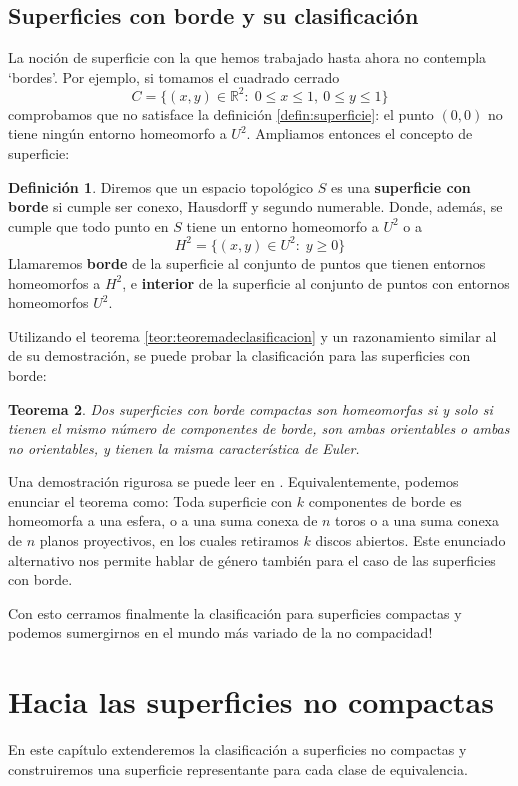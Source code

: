 \documentclass[a4paper,11pt,spanish, twoside, leqno]{tfg-uam}
\newcommand*{\reales}{\mathbb{R}}
\newtheorem{teor}{Teorema}[chapter]
\theoremstyle{definition}
\newtheorem{defin}[teor]{Definici\'on}
\begin{document}
\section{Superficies con borde y su clasificación}
\label{sec:superfborde}
La noción de superficie con la que hemos trabajado hasta ahora no contempla `bordes'. Por ejemplo, si tomamos el cuadrado cerrado
\[
C = \{(x,y)\in \reales^2:\; 0 \leq x \leq 1, \: 0 \leq y \leq 1  \}
\]
comprobamos que no satisface la definición \ref{defin:superficie}: el punto $(0,0)$ no tiene ningún entorno homeomorfo a $U^2$. Ampliamos entonces el concepto de superficie:

\begin{defin}
Diremos que un espacio topológico $S$ es una \textbf{superficie con borde} si cumple ser conexo, Hausdorff y segundo numerable. Donde, además, se cumple que todo punto en $S$ tiene un entorno homeomorfo a $U^2$ o a
\[H^2 = \{(x,y)\in U^2:\; y\geq0 \}\]
Llamaremos \textbf{borde} de la superficie al conjunto de puntos que tienen entornos homeomorfos a $H^2$, e \textbf{interior} de la superficie al conjunto de puntos con entornos homeomorfos $U^2$.
\end{defin}

Utilizando el teorema \ref{teor:teoremadeclasificacion} y un razonamiento similar al de su demostración, se puede probar la clasificación para las superficies con borde:

\begin{teor}
Dos superficies con borde compactas son homeomorfas si y solo si tienen el mismo número de componentes de borde, son ambas orientables o ambas no orientables, y tienen la misma característica de Euler.
\end{teor}

Una demostración rigurosa se puede leer en \cite{massey}. Equivalentemente, podemos enunciar el teorema como: Toda superficie con $k$ componentes de borde es homeomorfa a una esfera, o a una suma conexa de $n$ toros o a una suma conexa de $n$ planos proyectivos, en los cuales retiramos $k$ discos abiertos. Este enunciado alternativo nos permite hablar de género también para el caso de las superficies con borde. 

Con esto cerramos finalmente la clasificación para superficies compactas y  podemos sumergirnos en el mundo más variado de la no compacidad!



\chapter{Hacia las superficies no compactas}
En este capítulo extenderemos la clasificación a superficies no compactas y construiremos una superficie representante para cada clase de equivalencia.
\end{document}
